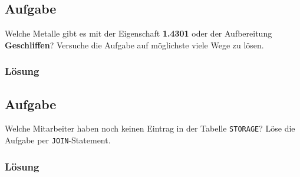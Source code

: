 \subsection{Aufgabe}
\label{sec:uebung_01.aufgabe_14}
Welche Metalle gibt es mit der Eigenschaft \textbf{1.4301} oder der Aufbereitung \textbf{Geschliffen}? Versuche die Aufgabe auf möglichste viele Wege zu lösen.

\subsubsection*{Lösung}
\label{sec:uebung_01.aufgabe_14.loesung}

\subsection{Aufgabe}
\label{sec:uebung_01.aufgabe_15}
Welche Mitarbeiter haben noch keinen Eintrag in der Tabelle \texttt{STORAGE}? Löse die Aufgabe per \texttt{JOIN}-Statement.

\subsubsection*{Lösung}
\label{sec:uebung_01.aufgabe_15.loesung}
